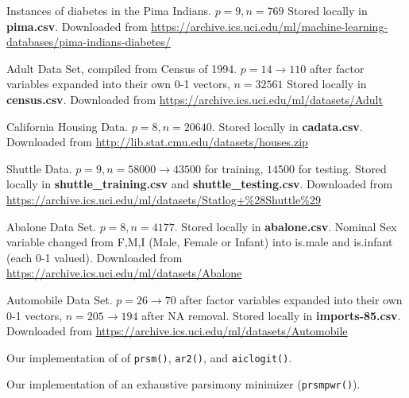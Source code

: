 \documentclass[letter]{article}
\begin{document}
\begin{thebibliography}{99}
    
      Instances of diabetes in the Pima Indians. $p=9, n=769$ Stored locally in \textbf{pima.csv}. Downloaded from \url{https://archive.ics.uci.edu/ml/machine-learning-databases/pima-indians-diabetes/} 
  
     Adult Data Set, compiled from Census of 1994. $p=14 \rightarrow 110$ after factor variables expanded into their own 0-1 vectors, $n=32561$ Stored locally in \textbf{census.csv}. Downloaded from \url{https://archive.ics.uci.edu/ml/datasets/Adult} 
    
     California Housing Data.  $p = 8, n=20640$. Stored locally in \textbf{cadata.csv}. Downloaded from \url{http://lib.stat.cmu.edu/datasets/houses.zip}
	
	 Shuttle Data.  $p = 9, n = 58000 \rightarrow 43500$ for training, $14500$ for testing. Stored locally in \textbf{shuttle\_training.csv} and \textbf{shuttle\_testing.csv}. Downloaded from \url{https://archive.ics.uci.edu/ml/datasets/Statlog+\%28Shuttle\%29}
    
     Abalone Data Set. $p = 8, n = 4177$. Stored locally in \textbf{abalone.csv}. Nominal Sex variable changed from F,M,I (Male, Female or Infant) into is.male and is.infant (each 0-1 valued). Downloaded from \url{https://archive.ics.uci.edu/ml/datasets/Abalone}
    
     Automobile Data Set. $p = 26 \rightarrow 70$ after factor variables expanded into their own 0-1 vectors, $n = 205 \rightarrow 194$ after NA removal. Stored locally in \textbf{imports-85.csv}. Downloaded from \url{https://archive.ics.uci.edu/ml/datasets/Automobile}
    
\end{thebibliography} 


\begin{appendices}

Our implementation of of \texttt{prsm()}, \texttt{ar2()}, and \texttt{aiclogit()}. 


Our implementation of an exhaustive parsimony minimizer (\texttt{prsmpwr()}).


\end{appendices}
 
\end{document}
